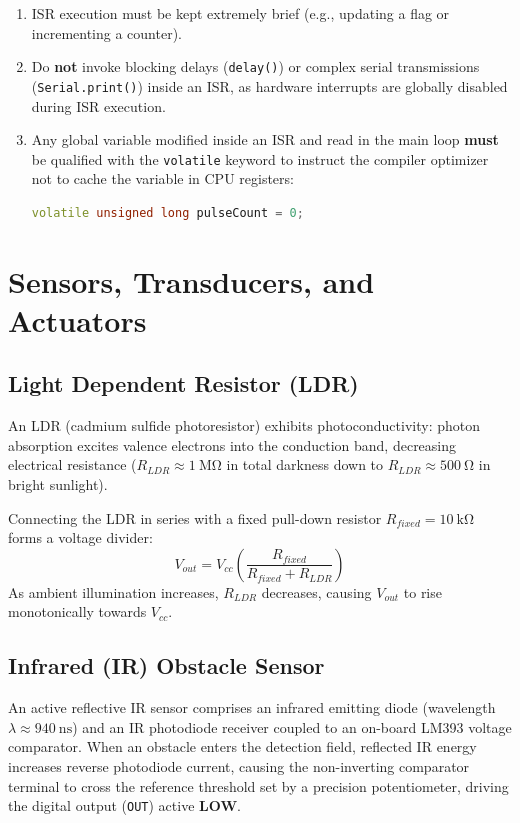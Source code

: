 \begin{pitfallbox}
\begin{enumerate}
    \item ISR execution must be kept extremely brief (e.g., updating a flag or incrementing a counter).
    \item Do \textbf{not} invoke blocking delays (\texttt{delay()}) or complex serial transmissions (\texttt{Serial.print()}) inside an ISR, as hardware interrupts are globally disabled during ISR execution.
    \item Any global variable modified inside an ISR and read in the main loop \textbf{must} be qualified with the \texttt{volatile} keyword to instruct the compiler optimizer not to cache the variable in CPU registers:
    \begin{lstlisting}[language=C++]
    volatile unsigned long pulseCount = 0;
    \end{lstlisting}
\end{enumerate}
\end{pitfallbox}

\section{Sensors, Transducers, and Actuators}
\subsection{Light Dependent Resistor (LDR)}
An LDR (cadmium sulfide photoresistor) exhibits photoconductivity: photon absorption excites valence electrons into the conduction band, decreasing electrical resistance ($R_{LDR} \approx \SI{1}{\mega\ohm}$ in total darkness down to $R_{LDR} \approx \SI{500}{\ohm}$ in bright sunlight).

\begin{derivationbox}
Connecting the LDR in series with a fixed pull-down resistor $R_{fixed} = \SI{10}{\kilo\ohm}$ forms a voltage divider:
\begin{equation}
V_{out} = V_{cc} \left( \frac{R_{fixed}}{R_{fixed} + R_{LDR}} \right)
\end{equation}
As ambient illumination increases, $R_{LDR}$ decreases, causing $V_{out}$ to rise monotonically towards $V_{cc}$.
\end{derivationbox}

\subsection{Infrared (IR) Obstacle Sensor}
An active reflective IR sensor comprises an infrared emitting diode (wavelength $\lambda \approx \SI{940}{\nano\second}$) and an IR photodiode receiver coupled to an on-board LM393 voltage comparator.
When an obstacle enters the detection field, reflected IR energy increases reverse photodiode current, causing the non-inverting comparator terminal to cross the reference threshold set by a precision potentiometer, driving the digital output (\texttt{OUT}) active \textbf{LOW}.

